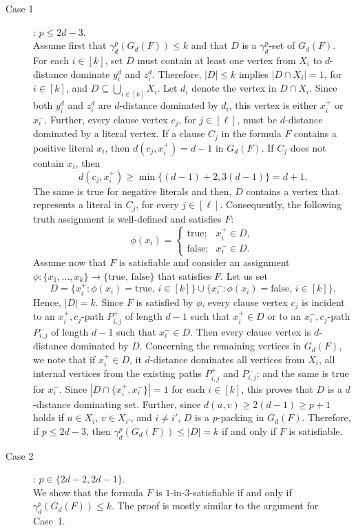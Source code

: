 \documentclass[12pt]{article}
\begin{document}
\begin{description}
    \item[Case 1]:  $p \leq 2d-3$.\\
Assume first that $\gamma_d^p(G_d(F)) \leq k$ and that $D$ is a $\gamma_d^p$-set of $G_d(F)$. For each $i \in [k]$, set $D$ must contain at least one vertex from $X_i$ to $d$-distance dominate $y_i^d$ and $z_i^d$. Therefore, $|D| \leq  k$ implies $|D \cap X_i|=1$, for $i \in [k]$, and $D \subseteq \bigcup_{i \in [k]} X_i$. Let $d_i$ denote the vertex in $D \cap X_i$. Since both $y_i^d$ and $z_i^d$ are $d$-distance dominated by $d_i$, this vertex is either $x_i^+$ or $x_i^-$. Further, every clause vertex $c_j$, for $j \in [\ell]$, must be $d$-distance dominated by a literal vertex. If a clause $C_j$ in the formula $F$ contains a positive literal $x_i$, then $d(c_j,x_i^+)=d-1$ in $G_d(F)$. If $C_j$ does not contain $x_i$, then 
\begin{equation} \label{eq:NP-1}
    d(c_j,x_i^+)\ge \min\{(d-1)+2, 3(d-1)\}= d+1.
\end{equation}
The same is true for negative literals and then, $D$ contains a vertex that represents a literal in $C_j$, for every $j \in [\ell]$. Consequently, the following truth assignment is well-defined and satisfies $F$:
\begin{equation}  \label{eq:NP-2}
    \phi(x_i)= \left\{ \begin{array}{ll}
		\mbox{true}; & x_i^+ \in D, \\		
		\mbox{false}; & x_i^- \in D.
	\end{array} \right. 
\end{equation}
Assume now that $F$ is satisfiable and consider an assignment $\phi: \{x_1, \dots, x_k\} \rightarrow \{ \mbox{true, false}\}$ that satisfies $F$.  Let us set
\begin{equation}  \label{eq:NP-3}
    D=\{x_i^+: \phi(x_i)=\mbox{true, } i \in [k]\} \cup \{x_i^-: \phi(x_i)=\mbox{false, } i \in [k]\}.
\end{equation}
Hence, $|D|=k$. Since $F$ is satisfied by $\phi$, every clause vertex $c_j$ is incident to an $x_i^+,c_j$-path $P_{i,j}^+$ of length $d-1$ such that $x_i^+ \in D$ or to an $x_i^-,c_j$-path $P_{i,j}^-$ of length $d-1$ such that $x_i^- \in D$.  Then every clause vertex is $d$-distance dominated by $D$. Concerning the remaining vertices in $G_d(F)$, we note that if $x_i^+ \in D$, it $d$-distance dominates all vertices from $X_i$, all internal vertices from the existing paths $P_{i,j}^+$ and $P_{i,j}^-$; and the same is true for $x_i^-$. Since $|D\cap \{x_i^+, x_i^-\}|=1$ for each $i\in [k]$, this proves that $D$ is a $d$-distance dominating set. Further, since $d(u,v) \ge 2(d-1)\ge p+1$ holds if $u \in X_i$, $v \in X_{i'}$, and $i \neq i'$, $D$ is a $p$-packing in $G_d(F)$. Therefore, if $p \leq 2d-3$, then $\gamma_d^p(G_d(F)) \leq |D| =k$ if and only if $F$ is satisfiable. 
\item[Case 2]:  $p \in \{2d-2, 2d-1\}$.\\
We show that the formula $F$ is $1$-in-$3$-satisfiable if and only if $\gamma_d^p(G_d(F)) \leq k$. The proof is mostly similar to the argument for Case~1. 


\end{description}
\end{document}
